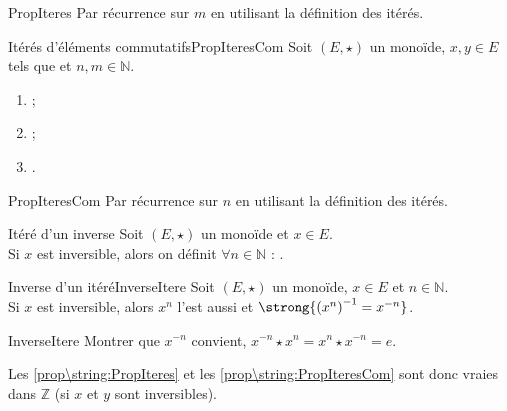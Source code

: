 \documentclass[12pt,a4paper]{report}
\begin{document}
    \begin{principedemo}{PropIteres}
    Par récurrence sur $m$ en utilisant la définition des itérés.
    \end{principedemo}

    \begin{propositions}{Itérés d'éléments commutatifs}{PropIteresCom}
    Soit $(E, \star)$ un monoïde, $x, y \in E$ tels que  et $n, m \in \mathbb{N}$.
    \begin{multicols}{3}
    \begin{enumerate}[label=\bfseries\arabic*)]
        \item {} ;
        \item {} ;
        \item {}.
    \end{enumerate}
    \end{multicols}
    \end{propositions}
    
    \begin{principedemo}{PropIteresCom}
    Par récurrence sur $n$ en utilisant la définition des itérés.
    \end{principedemo}
    
    \begin{definition}{Itéré d'un inverse}{}
    Soit $(E, \star)$ un monoïde et $x \in E$.\\
    Si $x$ est inversible, alors on définit $\forall n \in \mathbb{N}$ : .
    \end{definition}
    
    \begin{proposition}{Inverse d'un itéré}{InverseItere}
    Soit $(E, \star)$ un monoïde, $x \in E$ et $n \in \mathbb{N}$.\\
    Si $x$ est inversible, alors $x^n$ l'est aussi et $\strong{\left(x^n\right)^{-1} = x^{-n}}$.
    \end{proposition}
    
    \begin{principedemo}{InverseItere}
    Montrer que $x^{-n}$ convient, \ie $x^{-n} \star x^n = x^n \star x^{-n} = e$.
    \end{principedemo}
    
    \begin{remarque}
    Les \cref{prop\string:PropIteres}  et les \cref{prop\string:PropIteresCom}  sont donc vraies dans $\mathbb{Z}$ (si $x$ et $y$ sont inversibles).
    \end{remarque}
    
\end{document}
